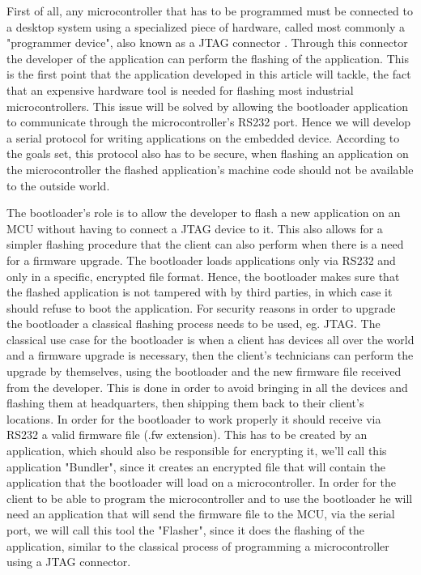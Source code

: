 \documentclass[10pt,a4paper,twoside]{article}
\begin{document}
First of all, any microcontroller that has to be programmed must be connected to a desktop system using a specialized piece of hardware, called most commonly a "programmer device", also known as a JTAG connector \cite{jtag}. Through this connector the developer of the application can perform the flashing of the application.
This is the first point that the application developed in this article will tackle, the fact that an expensive hardware tool is needed for flashing most industrial microcontrollers. This issue will be solved by allowing the bootloader application to communicate through the microcontroller's RS232 port. Hence we will develop a serial protocol for writing applications on the embedded device. According to the goals set, this protocol also has to be secure, when flashing an application on the microcontroller the flashed application's machine code should not be available to the outside world.

The bootloader’s role is to allow the developer to flash a new application on an MCU without having to connect a JTAG device to it. This also allows for a simpler flashing procedure that the client can also perform when there is a need for a firmware upgrade. The bootloader loads applications only via RS232 and only in a specific, encrypted file format. Hence, the bootloader makes sure that the flashed application is not tampered with by third parties, in which case it should refuse to boot the application. For security reasons in order to upgrade the bootloader a classical flashing process needs to be used, eg. JTAG.
The classical use case for the bootloader is when a client has devices all over the world and a firmware upgrade is necessary, then the client’s technicians can perform the upgrade by themselves, using the bootloader and the new firmware file received from the developer. This is done in order to avoid bringing in all the devices and flashing them at headquarters, then shipping them back to their client's locations.
In order for the bootloader to work properly it should receive via RS232 a valid firmware file (.fw extension).
This has to be created by an application, which should also be responsible for encrypting it, we'll call this application "Bundler", since it creates an encrypted file that will contain the application that the bootloader will load on a microcontroller. In order for the client to be able to program the microcontroller and to use the bootloader he will need an application that will send the firmware file to the MCU, via the serial port, we will call this tool the "Flasher", since it does the flashing of the application, similar to the classical process of programming a microcontroller using a JTAG connector.
\end{document}
